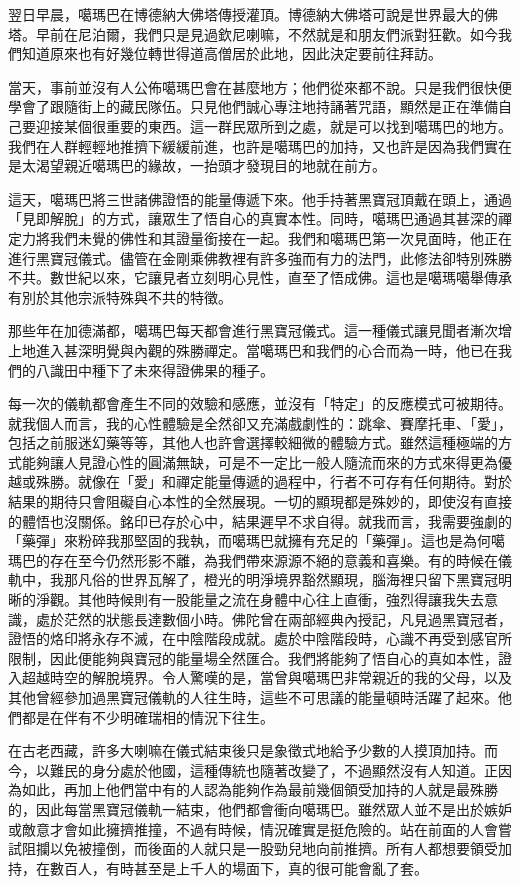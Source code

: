 翌日早晨，噶瑪巴在博德納大佛塔傳授灌頂。博德納大佛塔可說是世界最大的佛塔。早前在尼泊爾，我們只是見過欽尼喇嘛，不然就是和朋友們派對狂歡。如今我們知道原來也有好幾位轉世得道高僧居於此地，因此決定要前往拜訪。

當天，事前並沒有人公佈噶瑪巴會在甚麼地方；他們從來都不說。只是我們很快便學會了跟隨街上的藏民隊伍。只見他們誠心專注地持誦著咒語，顯然是正在準備自己要迎接某個很重要的東西。這一群民眾所到之處，就是可以找到噶瑪巴的地方。我們在人群輕輕地推擠下緩緩前進，也許是噶瑪巴的加持，又也許是因為我們實在是太渴望親近噶瑪巴的緣故，一抬頭才發現目的地就在前方。

這天，噶瑪巴將三世諸佛證悟的能量傳遞下來。他手持著黑寶冠頂戴在頭上，通過「見即解脫」的方式，讓眾生了悟自心的真實本性。同時，噶瑪巴通過其甚深的禪定力將我們未覺的佛性和其證量銜接在一起。我們和噶瑪巴第一次見面時，他正在進行黑寶冠儀式。儘管在金剛乘佛教裡有許多強而有力的法門，此修法卻特別殊勝不共。數世紀以來，它讓見者立刻明心見性，直至了悟成佛。這也是噶瑪噶舉傳承有別於其他宗派特殊與不共的特徵。

那些年在加德滿都，噶瑪巴每天都會進行黑寶冠儀式。這一種儀式讓見聞者漸次增上地進入甚深明覺與內觀的殊勝禪定。當噶瑪巴和我們的心合而為一時，他已在我們的八識田中種下了未來得證佛果的種子。

每一次的儀軌都會產生不同的效驗和感應，並沒有「特定」的反應模式可被期待。就我個人而言，我的心性體驗是全然卻又充滿戲劇性的：跳傘、賽摩托車、「愛」，包括之前服迷幻藥等等，其他人也許會選擇較細微的體驗方式。雖然這種極端的方式能夠讓人見證心性的圓滿無缺，可是不一定比一般人隨流而來的方式來得更為優越或殊勝。就像在「愛」和禪定能量傳遞的過程中，行者不可存有任何期待。對於結果的期待只會阻礙自心本性的全然展現。一切的顯現都是殊妙的，即使沒有直接的體悟也沒關係。銘印已存於心中，結果遲早不求自得。就我而言，我需要強劇的「藥彈」來粉碎我那堅固的我執，而噶瑪巴就擁有充足的「藥彈」。這也是為何噶瑪巴的存在至今仍然形影不離，為我們帶來源源不絕的意義和喜樂。有的時候在儀軌中，我那凡俗的世界瓦解了，橙光的明淨境界豁然顯現，腦海裡只留下黑寶冠明晰的淨觀。其他時候則有一股能量之流在身體中心往上直衝，強烈得讓我失去意識，處於茫然的狀態長達數個小時。佛陀曾在兩部經典內授記，凡見過黑寶冠者，證悟的烙印將永存不滅，在中陰階段成就。處於中陰階段時，心識不再受到感官所限制，因此便能夠與寶冠的能量場全然匯合。我們將能夠了悟自心的真如本性，證入超越時空的解脫境界。令人驚嘆的是，當曾與噶瑪巴非常親近的我的父母，以及其他曾經參加過黑寶冠儀軌的人往生時，這些不可思議的能量頓時活躍了起來。他們都是在伴有不少明確瑞相的情況下往生。

在古老西藏，許多大喇嘛在儀式結束後只是象徵式地給予少數的人摸頂加持。而今，以難民的身分處於他國，這種傳統也隨著改變了，不過顯然沒有人知道。正因為如此，再加上他們當中有的人認為能夠作為最前幾個領受加持的人就是最殊勝的，因此每當黑寶冠儀軌一結束，他們都會衝向噶瑪巴。雖然眾人並不是出於嫉妒或敵意才會如此擁擠推撞，不過有時候，情況確實是挺危險的。站在前面的人會嘗試阻攔以免被撞倒，而後面的人就只是一股勁兒地向前推擠。所有人都想要領受加持，在數百人，有時甚至是上千人的場面下，真的很可能會亂了套。

